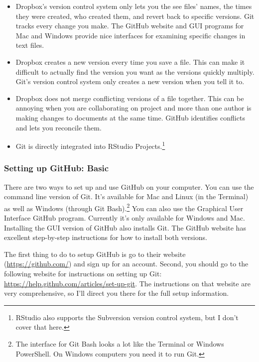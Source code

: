 \begin{itemize}
\item
  Dropbox's version control system only lets you the see files' names, the times they were created, who created them, and revert back to specific versions. Git tracks every change you make. The GitHub website and GUI programs for Mac and Windows provide nice interfaces for examining specific changes in text files.
\item
  Dropbox creates a new version every time you save a file. This can make it difficult to actually find the version you want as the versions quickly multiply. Git's version control system only creates a new version when you tell it to.
\item
  Dropbox does not merge conflicting versions of a file together. This can be annoying when you are collaborating on project and more than one author is making changes to documents at the same time. GitHub identifies conflicts and lets you reconcile them.
\item
  Git is directly integrated into RStudio Projects.\footnote{RStudio also supports the Subversion version
  control system, but I don't cover that here.}
\end{itemize}

\subsubsection{Setting up GitHub: Basic}

There are two ways to set up and use GitHub on your computer. You can use the command line version of Git. It's available for Mac and Linux (in the Terminal) as well as Windows (through Git Bash).\footnote{The interface for Git Bash looks a lot like the Terminal or Windows PowerShell. On Windows computers you need it to run Git.} You can also use the Graphical User Interface GitHub program. Currently it's only available for Windows and Mac. Installing the GUI version of GitHub also installs Git. The GitHub website has excellent step-by-step instructions for how to install both versions. 

The first thing to do to setup GitHub is go to their website (\url{https://github.com/}) and sign up for an account. Second, you should go to the following website for instructions on setting up Git: \url{https://help.github.com/articles/set-up-git}. The instructions on that website are very comprehensive, so I'll direct you there for the full setup information. 

